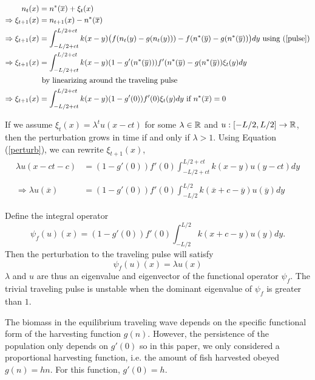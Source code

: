 \documentclass[12pt,english]{article}
\begin{document}
\begin{align}
n_t(x)&=n^*(\overline{x})+\xi_t(x) \notag
\\ \Rightarrow \xi_{t+1}(x)&=n_{t+1}(x)-n^*(\overline{x}) \notag
\\ \Rightarrow \xi_{t+1}(x)&=\int_{-L/2+ct}^{L/2+ct}k(x-y)\big(f(n_t(y)-g(n_t(y)))-f(n^*(\overline{y})-g(n^*(\overline{y}))\big)dy \text{ using (\ref{pulse})} \notag
\\ \Rightarrow \xi_{t+1}(x)&=\int_{-L/2+ct}^{L/2+ct}k(x-y)(1-g'(n^*(\overline{y})))f'(n^*(\overline{y})-g(n^*(\overline{y}))\xi_t(y)dy \notag
\\& \text{ by linearizing around the traveling pulse} \notag
\\ \Rightarrow \xi_{t+1}(x)&=\int_{-L/2+ct}^{L/2+ct}k(x-y)(1-g'(0))f'(0)\xi_t(y)dy \text{ if $n^*(\overline{x})=0$} \label{perturb}
\end{align}


If we assume $\xi_t(x)=\lambda^tu(x-ct)$ for some $\lambda\in{\mathbb{R}}$ and $u:[-L/2,L/2]\to{\mathbb{R}}$, then the perturbation grows in time if and only if $\lambda >1$.  Using Equation (\ref{perturb}), we can rewrite $\xi_{t+1}(x)$,
\begin{align*}
\lambda u(x-ct-c)&=(1-g'(0))f'(0)\int_{-L/2+ct}^{L/2+ct}k(x-y)u(y-ct)dy
\\ \\\Rightarrow \lambda u(\overline{x})&=(1-g'(0))f'(0)\int_{-L/2}^{L/2}k(\overline{x}+c-\overline{y})u(\overline{y})dy
\end{align*}

Define the integral operator
$$ \psi_f(u)(x)=(1-g'(0))f'(0)\int_{-L/2}^{L/2}k(x+c-y)u(y)dy. $$
Then the perturbation to the traveling pulse will satisfy 
\begin{equation} \psi_f(u)(x)=\lambda u(x) \label{eigen} \end{equation}
$\lambda$ and $u$ are thus an eigenvalue and eigenvector of the functional operator $\psi_f$.  The trivial traveling pulse is unstable when the dominant eigenvalue of $\psi_f$ is greater than $1$.


The biomass in the equilibrium traveling wave depends on the specific functional form of the harvesting function $g(n)$.  However, the persistence of the population only depends on $g'(0)$ so in this paper, we only considered a proportional harvesting function, i.e. the amount of fish harvested obeyed $g(n)=hn$.  For this function, $g'(0)=h$.  
\end{document}

